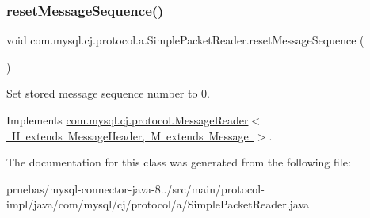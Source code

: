 \mbox{\label{classcom_1_1mysql_1_1cj_1_1protocol_1_1a_1_1_simple_packet_reader_a2dc67eb25eaee9e611b6fe3e9876877a}} 
\subsubsection{\texorpdfstring{reset\+Message\+Sequence()}{resetMessageSequence()}}
{\footnotesize\ttfamily void com.\+mysql.\+cj.\+protocol.\+a.\+Simple\+Packet\+Reader.\+reset\+Message\+Sequence (\begin{DoxyParamCaption}{ }\end{DoxyParamCaption})}

Set stored message sequence number to 0. 

Implements \mbox{\hyperlink{interfacecom_1_1mysql_1_1cj_1_1protocol_1_1_message_reader_a3161e55ab8c1bb4d533aa6d2700fb14d}{com.\+mysql.\+cj.\+protocol.\+Message\+Reader$<$ H extends Message\+Header, M extends Message $>$}}.



The documentation for this class was generated from the following file\+:\begin{DoxyCompactItemize}
\item 
pruebas/mysql-\/connector-\/java-\/8../src/main/protocol-\/impl/java/com/mysql/cj/protocol/a/Simple\+Packet\+Reader.\+java\end{DoxyCompactItemize}
